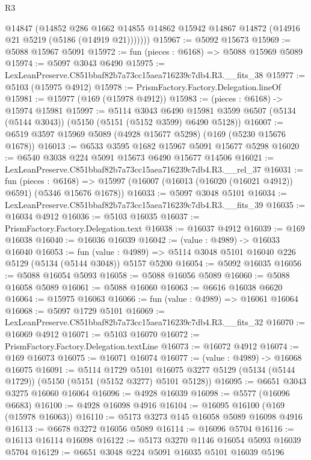 \begin{lexlean}{R3}
\begin{coremodule}
          @14847
          (@14852
            @286
            @1662
            @14855
            @14862
            @15942
            @14867
            @14872
            (@14916 @21 @5219 (@5186 (@14919 @21)))))))
@15967 := @5092 @15673
@15969 := @5088 @15967 @5091
@15972 := fun (pieces : @6168) => @5088 @15969 @5089
@15974 := @5097 @3043 @6490
@15975 := LexLeanPreserve.C851bbaf82b7a73cc15aea716239c7db4.R3.__fits_38
@15977 := @5103 (@15975 @4912)
@15978 := PrismFactory.Factory.Delegation.lineOf
@15981 := @15977 (@169 (@15978 @4912))
@15983 := (pieces : @6168) -> @15974 @15981
@15997 := @5114
    @3043
    @6490
    @15981
    @3599
    @6507
    (@5134 (@5144 @3043))
    (@5150 (@5151 (@5152 @3599) @6490 @5128))
@16007 := @6519 @3597 @15969 @5089 (@4928 @15677 @5298) (@169 (@5230 @15676 @1678))
@16013 := @6533 @3595 @1682 @15967 @5091 @15677 @5298
@16020 := @6540 @3038 @224 @5091 @15673 @6490 @15677 @14506
@16021 := LexLeanPreserve.C851bbaf82b7a73cc15aea716239c7db4.R3.__rel_37
@16031 := fun (pieces : @6168) =>
  @15997 (@16007 (@16013 (@16020 (@16021 @4912)) @6591) (@5346 @15676 @1678))
@16033 := @5097 @3048 @5101
@16034 := LexLeanPreserve.C851bbaf82b7a73cc15aea716239c7db4.R3.__fits_39
@16035 := @16034 @4912
@16036 := @5103 @16035
@16037 := PrismFactory.Factory.Delegation.text
@16038 := @16037 @4912
@16039 := @169 @16038
@16040 := @16036 @16039
@16042 := (value : @4989) -> @16033 @16040
@16053 := fun (value : @4989) =>
  @5114 @3048 @5101 @16040 @226 @5129 (@5134 (@5144 @3048)) @5157 @5200
@16054 := @5092 @16035
@16056 := @5088 @16054 @5093
@16058 := @5088 @16056 @5089
@16060 := @5088 @16058 @5089
@16061 := @5088 @16060
@16063 := @6616 @16038 @6620
@16064 := @15975 @16063
@16066 := fun (value : @4989) => @16061 @16064
@16068 := @5097 @1729 @5101
@16069 := LexLeanPreserve.C851bbaf82b7a73cc15aea716239c7db4.R3.__fits_32
@16070 := @16069 @4912
@16071 := @5103 @16070
@16072 := PrismFactory.Factory.Delegation.textLine
@16073 := @16072 @4912
@16074 := @169 @16073
@16075 := @16071 @16074
@16077 := (value : @4989) -> @16068 @16075
@16091 := @5114
    @1729
    @5101
    @16075
    @3277
    @5129
    (@5134 (@5144 @1729))
    (@5150 (@5151 (@5152 @3277) @5101 @5128))
@16095 := @6651 @3043 @3275 @16060 @16064
@16096 := @4928 @16039
@16098 := @5577 (@16096 @6683)
@16100 := @4928 @16098 @4916
@16104 := @16095 @16100 (@169 (@15978 @16063))
@16110 := @5173 @3273 @145 @16058 @5089 @16098 @4916
@16113 := @6678 @3272 @16056 @5089
@16114 := @16096 @5704
@16116 := @16113 @16114 @16098
@16122 := @5173 @3270 @1146 @16054 @5093 @16039 @5704
@16129 := @6651 @3048 @224 @5091 @16035 @5101 @16039 @5196

\end{coremodule}
\end{lexlean}
